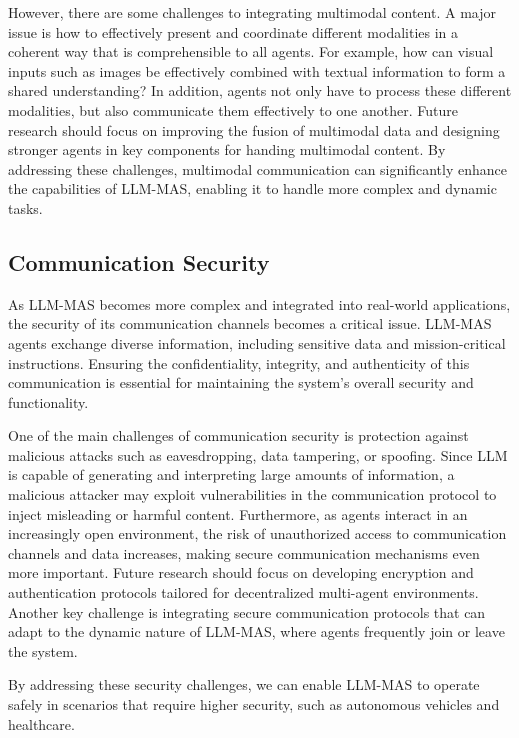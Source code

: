 However, there are some challenges to integrating multimodal content. A major issue is how to effectively present and coordinate different modalities in a coherent way that is comprehensible to all agents. For example, how can visual inputs such as images be effectively combined with textual information to form a shared understanding? In addition, agents not only have to process these different modalities, but also communicate them effectively to one another. Future research should focus on improving the fusion of multimodal data and designing stronger agents in key components for handing multimodal content. By addressing these challenges, multimodal communication can significantly enhance the capabilities of LLM-MAS, enabling it to handle more complex and dynamic tasks.
\subsection{Communication Security}
As LLM-MAS becomes more complex and integrated into real-world applications, the security of its communication channels becomes a critical issue. LLM-MAS agents exchange diverse information, including sensitive data and mission-critical instructions. Ensuring the confidentiality, integrity, and authenticity of this communication is essential for maintaining the system's overall security and functionality.

One of the main challenges of communication security is protection against malicious attacks such as eavesdropping, data tampering, or spoofing. Since LLM is capable of generating and interpreting large amounts of information, a malicious attacker may exploit vulnerabilities in the communication protocol to inject misleading or harmful content. Furthermore, as agents interact in an increasingly open environment, the risk of unauthorized access to communication channels and data increases, making secure communication mechanisms even more important. Future research should focus on developing encryption and authentication protocols tailored for decentralized multi-agent environments. Another key challenge is integrating secure communication protocols that can adapt to the dynamic nature of LLM-MAS, where agents frequently join or leave the system.

By addressing these security challenges, we can enable LLM-MAS to operate safely in scenarios that require higher security, such as autonomous vehicles and healthcare. 